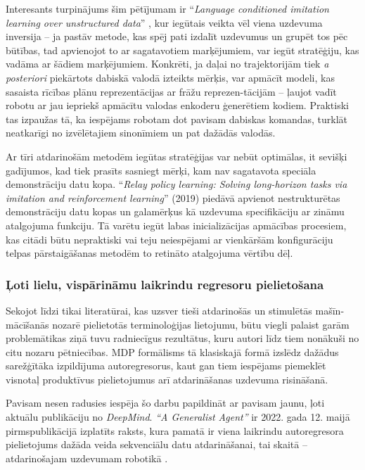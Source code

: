 \documentclass[12pt, a4paper]{article}
\numberwithin{equation}{section} %
\begin{document}
Interesants turpinājums šim pētījumam ir ``\textit{Language conditioned imitation learning over unstructured data}'' \cite{lynch2021language}, kur iegūtais veikta vēl viena uzdevuma inversija -- ja pastāv metode, kas spēj pati izdalīt uzdevumus un grupēt tos pēc būtības, tad apvienojot to ar sagatavotiem marķējumiem, var iegūt stratēģiju, kas vadāma ar šādiem marķējumiem. Konkrēti, ja daļai no trajektorijām tiek \textit{a posteriori} piekārtots dabiskā valodā izteikts mērķis, var apmācīt modeli, kas sasaista rīcības plānu reprezentācijas ar frāžu reprezen-tācijām -- ļaujot vadīt robotu ar jau iepriekš apmācītu valodas enkoderu ģenerētiem kodiem. Praktiski tas izpaužas tā, ka iespējams robotam dot pavisam dabiskas komandas, turklāt neatkarīgi no izvēlētajiem sinonīmiem un pat dažādās valodās.

Ar tīri atdarinošām metodēm iegūtas stratēģijas var nebūt optimālas, it sevišķi gadījumos, kad tiek prasīts sasniegt mērķi, kam nav sagatavota speciāla demonstrāciju datu kopa. ``\textit{Relay policy learning: Solving long-horizon tasks via imitation and reinforcement learning}'' \cite{gupta2019relay} (2019) piedāvā apvienot nestrukturētas demonstrāciju datu kopas un galamērķus kā uzdevuma specifikāciju ar zināmu atalgojuma funkciju. Tā varētu iegūt labas inicializācijas apmācības procesiem, kas citādi būtu nepraktiski vai teju neiespējami ar vienkāršām konfigurāciju telpas pārstaigāšanas metodēm to retināto atalgojuma vērtību dēļ.

\subsubsection{Ļoti lielu, vispārināmu laikrindu regresoru pielietošana}

Sekojot līdzi tikai literatūrai, kas uzsver tieši atdarinošās un stimulētās mašīn-mācīšanās nozarē pielietotās terminoloģijas lietojumu, būtu viegli palaist garām problemātikas ziņā tuvu radniecīgus rezultātus, kuru autori līdz tiem nonākuši no citu nozaru pētniecības. MDP formālisms tā klasiskajā formā izslēdz dažādus sarežģītāka izpildījuma autoregresorus, kaut gan tiem iespējams piemeklēt visnotaļ produktīvus pielietojumus arī atdarināšanas uzdevuma risināšanā.

Pavisam nesen radusies iespēja šo darbu papildināt ar pavisam jaunu, ļoti aktuālu publikāciju no \textit{DeepMind}. \textit{``A Generalist Agent''} ir 2022. gada 12. maijā pirmspublikācijā izplatīts raksts, kura pamatā ir viena laikrindu autoregresora pielietojums dažāda veida sekvenciālu datu atdarināšanai, tai skaitā -- atdarinošajam uzdevumam robotikā \cite{reed2022generalist}.
\end{document}
